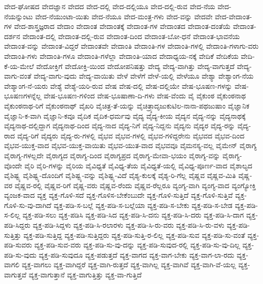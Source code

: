 {ವೇದ-ಘೋಷದ
ವೇದಜ್ಞಾನ
ವೇದದ
ವೇದ-ದಲ್ಲಿ
ವೇದ-ದಲ್ಲಿಯೂ
ವೇದ-ದಲ್ಲಿ-ರುವ
ವೇದ-ನೆಯ
ವೇದ-ನೆಯನ್ನುಂಟು
ವೇದ-ನೆಯುಂಟಾ-ಯಿತು
ವೇದ-ನೆಯೂ
ವೇದ-ಮಂತ್ರ-ಗಳು
ವೇದ-ವನ್ನು
ವೇದವೇ
ವೇದ-ವೇದಾಂತ-ಗಳ
ವೇದ-ಶಾಸ್ತ್ರಜ್ಞರಾದ
ವೇದಾಂ
ವೇದಾಂತ
ವೇದಾಂತಕ್ಕೆ
ವೇದಾಂತ-ಗಳ
ವೇದಾಂತದ
ವೇದಾಂತ-ದಂತೆಯೆ
ವೇದಾಂತ-ದರ್ಶನ
ವೇದಾಂತ-ದಲ್ಲಿ
ವೇದಾಂತ-ದಲ್ಲಿ-ರುವ
ವೇದಾಂತ-ದಿಂದ
ವೇದಾಂತ-ಬೋ-ಧನೆ
ವೇದಾಂತ-ಭಾವನೆಯ
ವೇದಾಂತ-ವನ್ನು
ವೇದಾಂತ-ವಿದ್ದರೆ
ವೇದಾಂತವೇ
ವೇದಾಂತಿ
ವೇದಾಂತಿ-ಗಳ
ವೇದಾಂತಿ-ಗಳಲ್ಲಿ
ವೇದಾಂತಿ-ಗಳಾಗು-ವರು
ವೇದಾಂತಿ-ಗಳು
ವೇದಾಂತಿ-ಗಳೂ
ವೇದಾಂತಿ-ಗಳೆಲ್ಲಾ
ವೇದಾಂತಿ-ಯಾದ
ವೇದಾಧ್ಯಯ-ನಕ್ಕೆ
ವೇದಿಕೆ
ವೇದಿಕೆಯ
ವೇದಿ-ಕೆ-ಯ-ಮೇಲೆ
ವೇದೋಕ್ತಿಗೆ
ವೇದೋಕ್ತಿ-ಯಿಂದ
ವೇದೋಪನಿಷತ್ತು
ವೇದ್ಯ
ವೇದ್ಯ-ವಾಗಿತ್ತು
ವೇದ್ಯ-ವಾಗುತ್ತದೆ
ವೇದ್ಯ-ವಾಗು-ವಂತೆ
ವೇದ್ಯ-ವಾಗು-ವುದು
ವೇದ್ಯ-ವಾಯಿತು
ವೇಳೆ
ವೇಳೆಗೆ
ವೇಳೆ-ಯಲ್ಲಿ
ವೇಳೆಯೂ
ವೇಶ್ಯಾ
ವೇಶ್ಯಾಂಗ-ನೆಯ
ವೇಶ್ಯಾಂಗ-ನೆ-ಯರು
ವೇಶ್ಯೆ
ವೇಶ್ಯೆ-ಯರಿ-ರುವ
ವೇಷ
ವೇಷ-ದಲ್ಲಿ
ವೇಷ-ದಲ್ಲಿಯೇ
ವೇಷ-ಭೂಷಣ-ಗಳನ್ನು
ವೇಷ-ಭೂಷಣಗಳನ್ನೆಲ್ಲ
ವೇಷ-ಭೂಷಣ-ಗಳಿಂದ
ವೇಷ-ಭೂಷಾಣಾ-ದಿ-ಗಳು
ವೇಷ-ವೆಂದು
ವೈ
ವೈಕುಂಠ
ವೈಕುಂಠನಾಥ
ವೈಕುಂಠನಾಥ-ರಿಗೆ
ವೈಕುಂಠನಾಥ್
ವೈಖರಿ
ವೈಚಿತ್ರ-ತೆ-ಯನ್ನು
ವೈಚಿತ್ರ್ಯಾದೃಜುಕುಟಿಲ-ನಾನಾ-ಪಥಜುಷಾಂ
ವೈಜ್ಞಾನಿಕ
ವೈಜ್ಞಾನಿ-ಕ-ವಾಗಿ
ವೈಜ್ಞಾನಿ-ಕವೂ
ವೈದಿಕ
ವೈದಿಕ-ಧರ್ಮವು
ವೈದ್ಯ
ವೈದ್ಯ-ಕೀಯ
ವೈದ್ಯನ
ವೈದ್ಯ-ನನ್ನು
ವೈದ್ಯನಾಥಕ್ಕೆ
ವೈದ್ಯನಾಥ-ದಲ್ಲಿದ್ದಾಗ
ವೈದ್ಯನಾಥ-ದಿಂದ
ವೈದ್ಯ-ನಾದ
ವೈದ್ಯ-ನಿಗೆ
ವೈದ್ಯ-ನಿದ್ದನು
ವೈದ್ಯನು
ವೈದ್ಯರ
ವೈದ್ಯ-ರನ್ನು
ವೈದ್ಯ-ರಾದ
ವೈದ್ಯ-ರಿಗೆ
ವೈದ್ಯರು
ವೈದ್ಯ-ರು-ಗಳಲ್ಲಿ
ವೈಭವ
ವೈಭವ-ಗಳಲ್ಲಿ
ವೈಭವ-ಗಳಿದ್ದರೇನು
ವೈಭವದ
ವೈಭವ-ದಿಂದ
ವೈಭವ-ಯುಕ್ತ-ವಾದ
ವೈಭವ-ಯುಕ್ತ-ವಾಯಿತು
ವೈಭವ-ಯುತ-ವಾದ
ವೈಭವವೂ
ವೈಮನಸ್ಯ-ವಲ್ಲ
ವೈಮೇನ್
ವೈರಾಗ್ಯ
ವೈರಾಗ್ಯ-ಗಳಲ್ಲದೇ
ವೈರಾಗ್ಯದ
ವೈರಾಗ್ಯ-ದಿಂದ
ವೈರಾಗ್ಯಪ್ರದ
ವೈರಾಗ್ಯ-ಮೇವಾ-ಭಯಂ
ವೈರಾಗ್ಯ-ವನ್ನು
ವೈರಾಗ್ಯ-ವೊಂದೇ
ವೈರಿ
ವೈರಿ-ಗಳನ್ನು
ವೈರಿಯ
ವೈವಿಧ್ಯತೆ
ವೈವಿಧ್ಯ-ತೆಯ
ವೈವಿಧ್ಯತೆ-ಯಲ್ಲಿ
ವೈವಿಧ್ಯ-ಪೂರ್ಣ-ವಾದ
ವೈಶಾಲ್ಯದ
ವೈಶಿಷ್ಟ್ಯ
ವೈಶಿಷ್ಟ್ಯ-ದೊಂದಿಗೆ
ವೈಶಿಷ್ಟ್ಯ-ವನ್ನು
ವೈಶಿಷ್ಟ್ಯ-ವಿದೆ
ವೈಶ್ಯ-ಕುಲಕ್ಕೆ
ವೈಶ್ಯ-ರಿ-ಗೆಲ್ಲ
ವೈಷ್ಣವ
ವೈಷ್ಣವ-ಮಿತಿ
ವೈಷ್ಣ-ವರ
ವೈಷ್ಣವ-ರಲ್ಲಿ
ವೈಷ್ಣವ-ರಿಗೆ
ವೈಷ್ಣ-ವರು
ವೈಷ್ಣವ-ರೆಂದು
ವೈಷ್ಣವ-ರೆಲ್ಲರೂ
ವ್ಯಂಗ್ಯ-ವಾಗಿ
ವ್ಯಂಗ್ಯ-ವಾದ
ವ್ಯಂಗ್ಯೋಕ್ತಿ
ವ್ಯಂಜಕ-ವಾದ
ವ್ಯಕ್ತ
ವ್ಯಕ್ತ-ಗೊಳಿ-ಸದೆ
ವ್ಯಕ್ತ-ಗೊಳಿಸ-ಬೇಕೆಂಬುದೇ
ವ್ಯಕ್ತ-ಗೊಳಿ-ಸುತ್ತಿದೆ
ವ್ಯಕ್ತ-ಗೊಳಿ-ಸುತ್ತಿವೆ
ವ್ಯಕ್ತ-ಗೊಳಿ-ಸು-ವು-ದಾಗಿದೆ
ವ್ಯಕ್ತ-ಪಡಿ-ಸ-ಬಲ್ಲೆ
ವ್ಯಕ್ತ-ಪಡಿ-ಸ-ಬಲ್ಲೆಯಾ
ವ್ಯಕ್ತ-ಪಡಿ-ಸ-ಬೇಕು
ವ್ಯಕ್ತ-ಪಡಿ-ಸ-ಬೇಡ
ವ್ಯಕ್ತ-ಪಡಿ-ಸ-ಲಿಲ್ಲ
ವ್ಯಕ್ತ-ಪಡಿ-ಸಲು
ವ್ಯಕ್ತ-ಪಡಿಸಿ
ವ್ಯಕ್ತ-ಪಡಿ-ಸಿದ
ವ್ಯಕ್ತ-ಪಡಿ-ಸಿ-ದನು
ವ್ಯಕ್ತ-ಪಡಿ-ಸಿ-ದರು
ವ್ಯಕ್ತ-ಪಡಿ-ಸಿ-ದಾಗ
ವ್ಯಕ್ತ-ಪಡಿ-ಸಿದ್ದರು
ವ್ಯಕ್ತ-ಪಡಿ-ಸಿದ್ದಳು
ವ್ಯಕ್ತ-ಪಡಿ-ಸಿ-ರಲಾರಳು
ವ್ಯಕ್ತ-ಪಡಿ-ಸಿ-ರು-ವರು
ವ್ಯಕ್ತ-ಪಡಿ-ಸಿ-ರು-ವಳು
ವ್ಯಕ್ತ-ಪಡಿ-ಸುತ್ತಿತ್ತು
ವ್ಯಕ್ತ-ಪಡಿ-ಸುತ್ತಿದ್ದ
ವ್ಯಕ್ತ-ಪಡಿ-ಸುತ್ತಿದ್ದರು
ವ್ಯಕ್ತ-ಪಡಿ-ಸುತ್ತಿ-ರ-ಲಿಲ್ಲ
ವ್ಯಕ್ತ-ಪಡಿ-ಸುವ
ವ್ಯಕ್ತ-ಪಡಿ-ಸು-ವಂತೆ
ವ್ಯಕ್ತ-ಪಡಿ-ಸುವರು
ವ್ಯಕ್ತ-ಪಡಿ-ಸುವ-ವರು
ವ್ಯಕ್ತ-ಪಡಿ-ಸು-ವು-ದನ್ನು
ವ್ಯಕ್ತ-ಪಡಿ-ಸುವುದ-ರಲ್ಲಿ
ವ್ಯಕ್ತ-ಪಡಿ-ಸು-ವು-ದಿಲ್ಲ
ವ್ಯಕ್ತ-ಪಡಿ-ಸು-ವುದು
ವ್ಯಕ್ತ-ಪಡಿ-ಸುವುದೂ
ವ್ಯಕ್ತ-ಪಡುತ್ತದೆ
ವ್ಯಕ್ತ-ವಾಗದ
ವ್ಯಕ್ತ-ವಾಗ-ಬೇಕು
ವ್ಯಕ್ತ-ವಾಗ-ಲಾ-ರದು
ವ್ಯಕ್ತ-ವಾಗಲಿ
ವ್ಯಕ್ತ-ವಾಗಲು
ವ್ಯಕ್ತ-ವಾಗಿದ್ದರೆ
ವ್ಯಕ್ತ-ವಾಗಿ-ರುತ್ತದೆ
ವ್ಯಕ್ತ-ವಾಗಿಲ್ಲ
ವ್ಯಕ್ತ-ವಾಗಿವೆ
ವ್ಯಕ್ತ-ವಾಗಿ-ವೆ-ಯಲ್ಲ
ವ್ಯಕ್ತ-ವಾಗುತ್ತವೆ
ವ್ಯಕ್ತ-ವಾಗುತ್ತಾನೆ
ವ್ಯಕ್ತ-ವಾಗುತ್ತಿತ್ತು
ವ್ಯಕ್ತ-ವಾ-ಗುತ್ತಿದೆ
}
